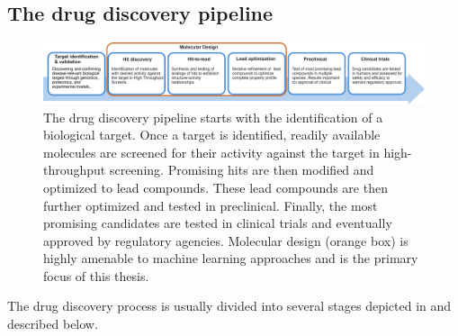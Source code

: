 \subsection{The drug discovery pipeline}
\begin{figure}
      \centering
      \includegraphics[width=\textwidth]{figures/drug-discovery-pipeline_v2.pdf}
      \caption{The drug discovery pipeline starts with the identification of a biological target.
            Once a target is identified, readily available molecules are screened for their activity
            against the target in high-throughput screening. Promising hits are then modified and
            optimized to lead compounds. These lead compounds are then further optimized and tested
            in preclinical. Finally, the most promising candidates are tested in clinical trials and
            eventually approved by regulatory agencies. Molecular design (orange box) is highly amenable to 
            machine learning approaches and is the primary focus of this thesis.\label{fig:drug-discovery-pipeline}}
\end{figure}

The drug discovery process is usually divided into several stages \citep{todo} depicted in
 and described below.


